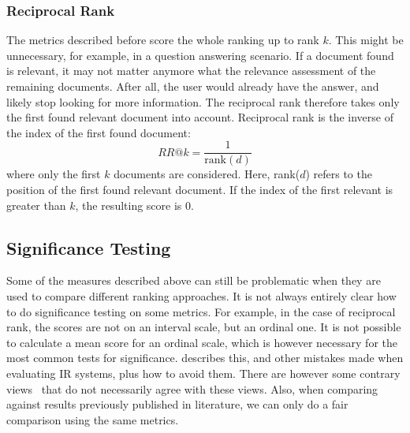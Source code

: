 \subsubsection{Reciprocal Rank} 
The metrics described before score the whole ranking up to rank $k$. This might be unnecessary, for example, in a question answering scenario. If a document found is relevant, it may not matter anymore what the relevance assessment of the remaining documents. After all, the user would already have the answer, and likely stop looking for more information. The reciprocal rank therefore takes only the first found relevant document into account. Reciprocal rank is the inverse of the index of the first found document:
\begin{equation}
	\textit{RR@k} = \frac{1}{\text{rank}(d)}
\end{equation}
where only the first $k$ documents are considered. Here, rank($d$) refers to the position of the first found relevant document. If the index of the first relevant is greater than $k$, the resulting score is $0$.

\subsection{Significance Testing}
Some of the measures described above can still be problematic when they are used to compare different ranking approaches. It is not always entirely clear how to do significance testing on some metrics. For example, in the case of reciprocal rank, the scores are not on an interval scale, but an ordinal one. It is not possible to calculate a mean score for an ordinal scale, which is however necessary for the most common tests for significance.  describes this, and other mistakes made when evaluating IR systems, plus how to avoid them. There are however some contrary views~\citep{on-fuhrs-guideline} that do not necessarily agree with these views. Also, when comparing against results previously published in literature, we can only do a fair comparison using the same metrics. 

